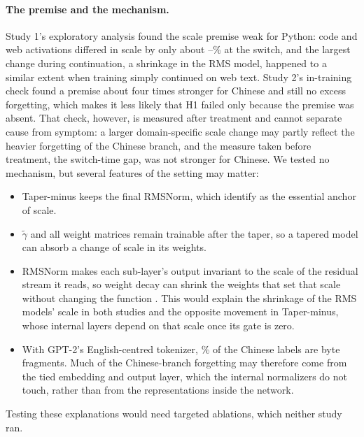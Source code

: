 \documentclass[11pt]{article}
\begin{document}
\paragraph{The premise and the mechanism.} Study 1's exploratory analysis found the scale premise weak for Python:
code and web activations differed in scale by only about \scaleGapPctR--\scaleGapPctT\% at the switch, and the
largest change during continuation, a shrinkage in the RMS model, happened to a similar extent when training simply
continued on web text. Study 2's in-training check found a premise about four times stronger for Chinese and
still no excess forgetting, which makes it less likely that H1 failed only because the premise was absent. That
check, however, is measured after treatment and cannot separate cause from symptom: a larger domain-specific scale
change may partly reflect the heavier forgetting of the Chinese branch, and the measure taken before treatment,
the switch-time gap, was not stronger for Chinese. We tested no mechanism, but several features of the setting may
matter:
\begin{itemize}[leftmargin=1.4em,itemsep=2pt]
  \item Taper-minus keeps the final RMSNorm, which \citet{kanavalau2026tapernorm} identify as the essential
        anchor of scale.
  \item $\tilde\gamma$ and all weight matrices remain trainable after the taper, so a tapered model can absorb a
        change of scale in its weights.
  \item RMSNorm makes each sub-layer's output invariant to the scale of the residual stream it reads, so weight
        decay can shrink the weights that set that scale without changing the function
        \citep{vanlaarhoven2017l2,zhang2019weightdecay}. This would explain the shrinkage of the RMS models'
        scale in both studies and the opposite movement in Taper-minus, whose internal layers depend on that
        scale once its gate is zero.
  \item With GPT-2's English-centred tokenizer, \twoCtrlShare\% of the Chinese labels are byte fragments. Much of
        the Chinese-branch forgetting may therefore come from the tied embedding and output layer, which the
        internal normalizers do not touch, rather than from the representations inside the network.
\end{itemize}
Testing these explanations would need targeted ablations, which neither study ran.
\end{document}
